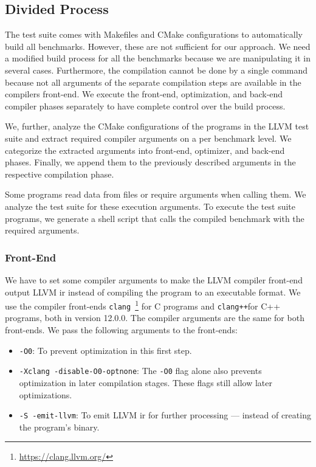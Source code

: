 \subsection{Divided Process}
\label{sec:approach:divided-build}
The test suite comes with Makefiles and CMake configurations to automatically build all benchmarks.
However, these are not sufficient for our approach.
We need a modified build process for all the benchmarks because we are manipulating it in several cases.
Furthermore, the compilation cannot be done by a single command because not all arguments of the separate compilation steps are available in the compilers front-end.
We execute the front-end, optimization, and back-end compiler phases separately to have complete control over the build process.

We, further, analyze the CMake configurations of the programs in the LLVM test suite and extract required compiler arguments on a per benchmark level.
We categorize the extracted arguments into front-end, optimizer, and back-end phases.
Finally, we append them to the previously described arguments in the respective compilation phase.

Some programs read data from files or require arguments when calling them.
We analyze the test suite for these execution arguments.
To execute the test suite programs, we generate a shell script that calls the compiled benchmark with the required arguments.

\subsubsection{Front-End}
We have to set some compiler arguments to make the LLVM compiler front-end output LLVM \ac{ir} instead of compiling the program to an executable format.
We use the compiler front-ends \lstinline{clang}~\footnote{\url{https://clang.llvm.org/}} for C programs and \lstinline{clang++}\footnotemark[1] for C++ programs, both in version 12.0.0.
The compiler arguments are the same for both front-ends.
We pass the following arguments to the front-ends:
\begin{itemize}
    \item \lstinline{-O0}: To prevent optimization in this first step.
    \item \lstinline{-Xclang -disable-O0-optnone}: The \lstinline{-O0} flag alone also prevents optimization in later compilation stages. These flags still allow later optimizations.
    \item \lstinline{-S -emit-llvm}: To emit LLVM \ac{ir} for further processing --- instead of creating the program's binary.
\end{itemize}

